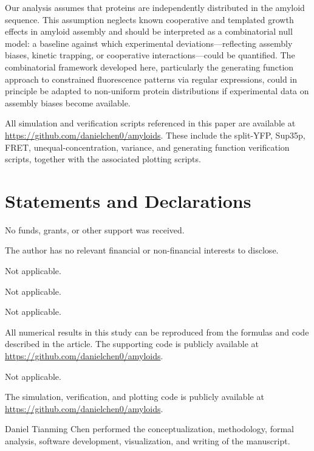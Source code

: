 \documentclass[referee,lineno,pdflatex,sn-mathphys-ay]{sn-jnl}
\begin{document}
Our analysis assumes that proteins are independently distributed in the amyloid sequence. This assumption neglects known cooperative and templated growth effects in amyloid assembly \citep{chiti2006} and should be interpreted as a combinatorial null model: a baseline against which experimental deviations---reflecting assembly biases, kinetic trapping, or cooperative interactions---could be quantified. The combinatorial framework developed here, particularly the generating function approach to constrained fluorescence patterns via regular expressions, could in principle be adapted to non-uniform protein distributions if experimental data on assembly biases become available.

All simulation and verification scripts referenced in this paper are available at
\url{https://github.com/danielchen0/amyloids}.
These include the split-YFP, Sup35p, FRET, unequal-concentration, variance, and
generating function verification scripts, together with the associated plotting scripts.

\backmatter

\section*{Statements and Declarations}

No funds, grants, or other support was received.

The author has no relevant financial or non-financial interests to disclose.

Not applicable.

Not applicable.

Not applicable.

All numerical results in this study can be reproduced from the formulas and code described in the article. The supporting code is publicly available at \url{https://github.com/danielchen0/amyloids}.

Not applicable.

The simulation, verification, and plotting code is publicly available at \url{https://github.com/danielchen0/amyloids}.

Daniel Tianming Chen performed the conceptualization, methodology, formal analysis, software development, visualization, and writing of the manuscript.


\end{document}
